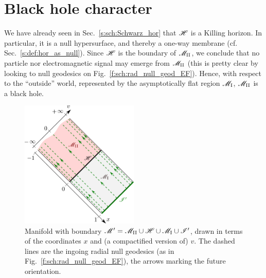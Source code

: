 
\section{Black hole character} \label{s:sch:BH}

We have already seen in Sec.~\ref{s:sch:Schwarz_hor} that $\mathscr{H}$ is
a Killing horizon. In particular, it is a null hypersurface, and thereby a
one-way membrane (cf. Sec.~\ref{s:def:hor_as_null}).
Since $\mathscr{H}$ is the boundary of $\mathscr{M}_{\rm II}$, we conclude that no particle nor
electromagnetic signal may emerge from $\mathscr{M}_{\rm II}$
(this is pretty clear by looking to null geodesics on
Fig.~\ref{f:sch:rad_null_geod_EF}). Hence, with respect to the ``outside''
world, represented by the asymptotically flat region $\mathscr{M}_{\rm I}$,
$\mathscr{M}_{\rm II}$ is a black hole.

\begin{figure}
\centerline{\includegraphics[width=0.5\textwidth]{sch_conf_compl1.pdf}}
\caption[]{\label{f:sch:conf_compl1} \footnotesize
Manifold with boundary
$\mathscr{M}' = \mathscr{M}_{\rm II}\cup\mathscr{H}\cup\mathscr{M}_{\rm I}\cup\mathscr{I}'$, drawn in terms of
the coordinates $x$ and (a compactified version of) $v$.
The dashed lines are the ingoing radial null geodesics (as in Fig.~\ref{f:sch:rad_null_geod_EF}), the arrows marking the future orientation.}
\end{figure}


